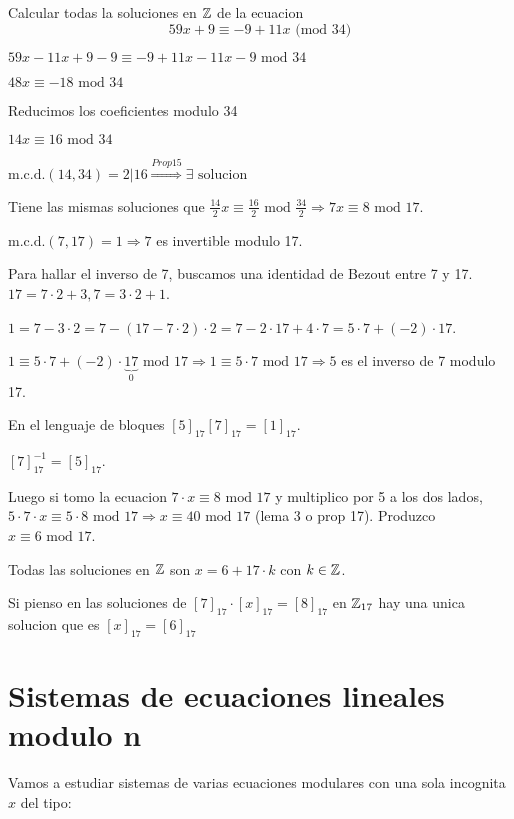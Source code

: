 \begin{example}
	Calcular todas la soluciones en \(\mathbb{Z} \) de la ecuacion
	\[
		59x + 9 \equiv -9 + 11x \text{ (mod 34)}
	\]
	
	\(59x - 11x + 9 - 9 \equiv -9 + 11x - 11x - 9 \text{ mod } 34 \)
	
	\(48x \equiv -18 \text{ mod 34 } \)
	
	Reducimos los coeficientes modulo 34
	
	\(14x \equiv 16 \text{ mod 34 } \)
	
	\(\mathrm{m.c.d.}(14,34) = 2 | 16 \overset{Prop 15}{\Rightarrow} \exists \text{ solucion}  \)
	
	Tiene las mismas soluciones que \(\frac{14}{2}x \equiv \frac{16}{2}  \text{ mod } \frac{34}{2} \Rightarrow 7x \equiv 8 \text{ mod } 17 \).
	
	\(\mathrm{m.c.d.}(7,17) = 1 \Rightarrow 7 \) es invertible modulo 17.
	
	Para hallar el inverso de 7, buscamos una identidad de Bezout entre 7 y 17. \(17 = 7 \cdot 2 + 3, 7 = 3 \cdot 2 + 1 \).
	
	\(1 = 7 - 3 \cdot 2 = 7 - (17 - 7 \cdot 2) \cdot 2 = 7 - 2 \cdot 17 + 4 \cdot 7 = 5 \cdot 7 + (-2) \cdot 17 \).
	
	\(1 \equiv  5 \cdot 7 + (-2) \cdot \underbrace{17}_0 \text{ mod } 17  \Rightarrow 1 \equiv 5 \cdot 7 \text{ mod } 17 \Rightarrow 5 \) es el inverso de 7 modulo 17.
	
	En el lenguaje de bloques \([5]_{17} [7]_{17} = [1]_{17}\).
	
	\([7]^{-1}_{17} = [5]_{17} \).
	
	Luego si tomo la ecuacion \(7 \cdot x \equiv 8 \text{ mod } 17 	\) y multiplico por 5 a los dos lados, \(5 \cdot 7 \cdot x \equiv 5 \cdot 8 \text{ mod } 17 \Rightarrow x \equiv 40 \text{ mod } 17 \) (lema 3 o prop 17). Produzco \(x \equiv 6 \text{ mod }17 \).
	
	Todas las soluciones en \(\mathbb{Z} \) son \(x = 6 + 17 \cdot k \) con \(k \in \mathbb{Z} \).
	
	Si pienso en las soluciones de \([7]_{17} \cdot [x]_{17} = [8 ]_{17}\) en \(\mathbb{Z}_{17 }\) hay una unica solucion que es \([x]_{17} = [6]_{17}\)
\end{example}

\section{Sistemas de ecuaciones lineales modulo n}

Vamos a estudiar sistemas de varias ecuaciones modulares con una sola incognita \(x \) del tipo:

